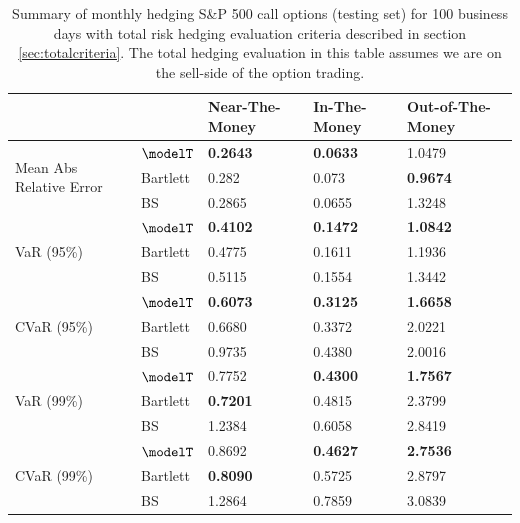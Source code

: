 \begin{table}[htp!]
	\centering
	\begin{tabular}{ll|l|l|l|}
		\cline{3-5}
		&          & Near-The-Money   & In-The-Money     & Out-of-The-Money \\ \hline
		\multicolumn{1}{|l|}{\multirow{3}{*}{Mean Abs Relative Error}} & $\modelT$    & \textbf{0.2643}  & \textbf{0.0633}  & 1.0479           \\  
		\multicolumn{1}{|l|}{}                                & Bartlett & 0.282            & 0.073            & \textbf{0.9674}  \\  
		\multicolumn{1}{|l|}{}                                & BS       & 0.2865           & 0.0655           & 1.3248           \\ \hline
		\multicolumn{1}{|l|}{\multirow{3}{*}{VaR (95\%)}}     & $\modelT$    & \textbf{0.4102}          & \textbf{0.1472}          & \textbf{1.0842}          \\  
		\multicolumn{1}{|l|}{}                                & Bartlett & 0.4775          & 0.1611          & 1.1936          \\  
		\multicolumn{1}{|l|}{}                                & BS       & 0.5115          & 0.1554          & 1.3442          \\ \hline
		\multicolumn{1}{|l|}{\multirow{3}{*}{CVaR (95\%)}}    & $\modelT$    & \textbf{0.6073} & \textbf{0.3125} & \textbf{1.6658} \\  
		\multicolumn{1}{|l|}{}                                & Bartlett & 0.6680          & 0.3372          & 2.0221          \\  
		\multicolumn{1}{|l|}{}                                & BS       & 0.9735          & 0.4380          & 2.0016          \\ \hline
		\multicolumn{1}{|l|}{\multirow{3}{*}{VaR (99\%)}}     & $\modelT$    & 0.7752          & \textbf{0.4300} & \textbf{1.7567} \\  
		\multicolumn{1}{|l|}{}                                & Bartlett & \textbf{0.7201} & 0.4815          & 2.3799          \\  
		\multicolumn{1}{|l|}{}                                & BS       & 1.2384          & 0.6058          & 2.8419          \\ \hline
		\multicolumn{1}{|l|}{\multirow{3}{*}{CVaR (99\%)}}    & $\modelT$    & 0.8692          & \textbf{0.4627} & \textbf{2.7536}          \\  
		\multicolumn{1}{|l|}{}                                & Bartlett & \textbf{0.8090}  & 0.5725          & 2.8797          \\  
		\multicolumn{1}{|l|}{}                                & BS       & 1.2864          & 0.7859          & 3.0839          \\ \hline
	\end{tabular}
	\caption{Summary of monthly hedging S\&P 500 call options (testing set) for 100 business days with total risk hedging evaluation criteria described in  section \ref{sec:totalcriteria}. The total hedging evaluation in this table assumes we are on the sell-side of the option trading.} \label{table:CallTotalM}
\end{table}
